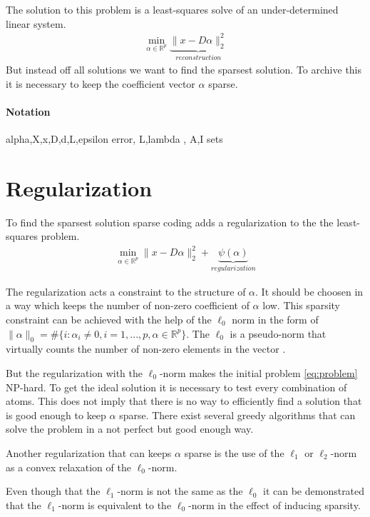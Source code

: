 The solution to this problem is a least-squares solve of an under-determined
linear system. 
\begin{align}
\min_{\alpha\in\mathbb{R}^{p}} \underbrace{\lVert x - D\alpha \rVert^{2}_{2}}_{reconstruction} \label{eq:problem}
\end{align}
But instead off all solutions we want to find the sparsest solution. 
To archive this it is necessary to keep the coefficient vector $\alpha$ sparse.
\paragraph{Notation}
alpha,X,x,D,d,L,epsilon error, L,lambda , A,I sets

\section{Regularization}
To find the sparsest solution sparse coding adds a regularization to the
the least-squares problem. 
\begin{align}
\min_{\alpha\in\mathbb{R}^{p}} \lVert x - D\alpha \rVert^{2}_{2} + \underbrace{\psi(\alpha)}_{regularization}
\end{align}

The regularization acts a constraint to the structure of $\alpha$. It should be
choosen in a way which keeps the number of non-zero coefficient of $\alpha$ low.
This sparsity constraint can be achieved with the help of the $\ell_0$ norm in
the form of $\lVert\alpha\rVert_{0} = \#\{i:\alpha_i \neq
0,i=1,...,p,\alpha\in\mathbb{R}^p\}$. The $\ell_0$ is a pseudo-norm that
virtually counts the number of non-zero elements in the vector .

But the regularization with the $\ell_0$-norm makes the initial problem
\ref{eq:problem} NP-hard. To get the ideal solution it is necessary to test
every combination of atoms. This does not imply that there is no way to
efficiently find a solution that is good enough to keep $\alpha$ sparse.
There exist several greedy algorithms that can solve the problem in a
not perfect but good enough way. 

Another regularization that can keeps $\alpha$ sparse is the use of the $\ell_1$
or $\ell_2$-norm as a convex relaxation of the $\ell_0$-norm.

Even though that the $\ell_1$-norm is not the same as the $\ell_0$ it can
be demonstrated that the $\ell_1$-norm is equivalent to the $\ell_0$-norm in
the effect of inducing sparsity.

